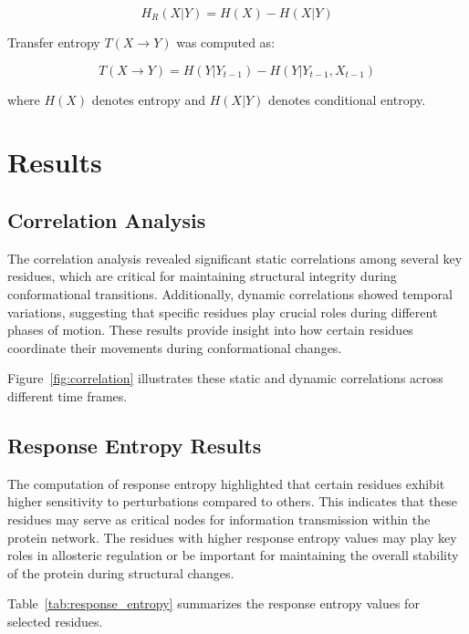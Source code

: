 \documentclass{report}  %
\begin{document}
\[
H_R(X|Y) = H(X) - H(X|Y)
\]

Transfer entropy \(T(X \to Y)\) was computed as:

\[
T(X \to Y) = H(Y|Y_{t-1}) - H(Y|Y_{t-1}, X_{t-1})
\]

where \(H(X)\) denotes entropy and \(H(X|Y)\) denotes conditional entropy.

\chapter{Results}

\section{Correlation Analysis}
The correlation analysis revealed significant static correlations among several key residues, which are critical for maintaining structural integrity during conformational transitions. Additionally, dynamic correlations showed temporal variations, suggesting that specific residues play crucial roles during different phases of motion. These results provide insight into how certain residues coordinate their movements during conformational changes.

Figure~\ref{fig:correlation} illustrates these static and dynamic correlations across different time frames.


\section{Response Entropy Results}
The computation of response entropy highlighted that certain residues exhibit higher sensitivity to perturbations compared to others. This indicates that these residues may serve as critical nodes for information transmission within the protein network. The residues with higher response entropy values may play key roles in allosteric regulation or be important for maintaining the overall stability of the protein during structural changes.

Table~\ref{tab:response_entropy} summarizes the response entropy values for selected residues.
\end{document}
